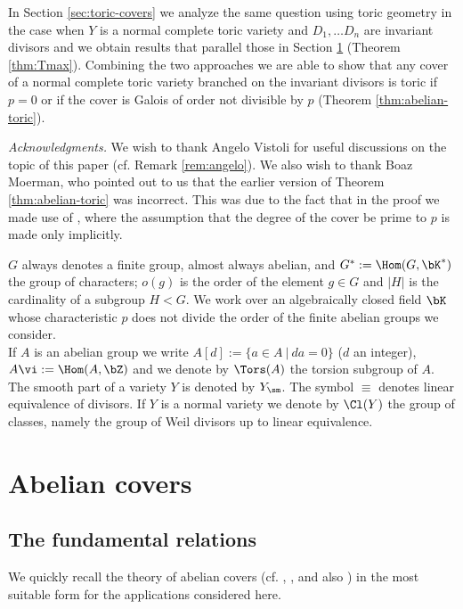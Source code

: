\documentclass[10pt]{amsart}
\numberwithin{equation}{section}
\begin{document}
In Section \ref{sec:toric-covers} we analyze the same question using toric geometry in the case when $Y$ is a normal complete toric variety and $D_1,\dots D_n$ are invariant divisors and we obtain results that parallel those in Section \ref{sec:abelian} (Theorem \ref{thm:Tmax}). Combining the two approaches we are able to show that   any  
 cover of a normal complete toric variety branched on the invariant divisors is toric if  $p=0$ or if the cover is Galois of order not divisible by $p$ (Theorem \ref{thm:abelian-toric}). 
\smallskip

{\em Acknowledgments.} We wish to thank Angelo Vistoli for useful  discussions on the topic of this paper (cf. Remark \ref{rem:angelo}). We also wish to thank  Boaz Moerman, who pointed out to us that the earlier version of Theorem \ref{thm:abelian-toric} was incorrect. 
 This was due to the fact that in the proof we made use of \cite[Prop. 1]{Miyanishi}, where the  assumption that the degree of the cover be prime to $p$  is made only implicitly.
\bigskip

$G$ always denotes a finite  group, almost always abelian,  and $G^*:=\Hom(G,\bK^*)$ the group of characters; $o(g)$ is the order of the element $g\in G$ and $|H|$ is the cardinality of a subgroup $H<G$. We work over an algebraically closed field $\bK$ whose characteristic $p$ does not divide the order of  the finite abelian groups we consider.\\
If $A$ is an abelian group we write $A[d]:=\{a\in A\ |\ da=0\}$ ($d$ an integer),  $A\vi:=\Hom (A,\bZ)$ and we denote by $\Tors(A)$ the torsion subgroup of $A$.\\
The smooth part of a variety $Y$ is denoted by $Y_{\sm}$.
The symbol $\equiv$ denotes linear equivalence of divisors. If $Y$ is a normal variety we denote by $\Cl(Y)$ the group of classes, namely the group of Weil divisors up to linear equivalence. 

\section{Abelian covers}\label{sec:abelian}

\subsection{The fundamental relations} \label{ssec:fundrel}
We quickly recall  the theory of abelian covers (cf. \cite{Pardini_AbelianCovers},  \cite{AlexeevPardini_Covers}, and also \cite{PardiniTovena_fundgroup}) in the most   suitable form  for the applications considered here.
\end{document}
